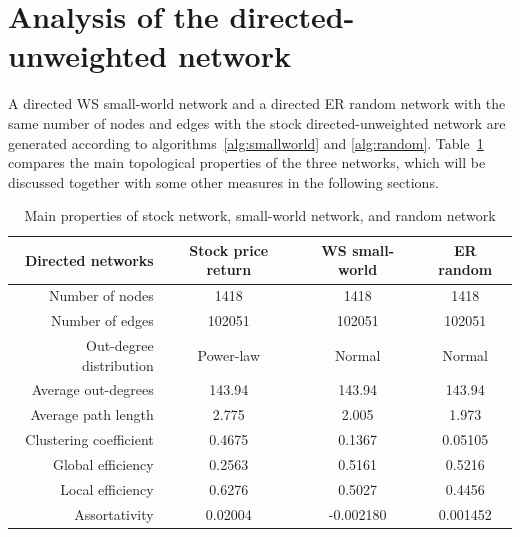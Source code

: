 \section{Analysis of the directed-unweighted network}
A directed WS small-world network and a directed ER random network with the same number of nodes and edges with the stock directed-unweighted network are generated according to algorithms~\ref{alg:smallworld} and \ref{alg:random}. Table~\ref{tab:three} compares the main topological properties of the three networks, which will be discussed together with some other measures in the following sections.

\begin{table}
	\begin{center}
		\begin{tabular}{r|c|c|c}\hline\hline
			\textbf{Directed networks}&\textbf{Stock price return}&\textbf{WS small-world}&\textbf{ER random}\\\hline
			Number of nodes&1418&1418&1418\\
			Number of edges&102051&102051&102051\\
			Out-degree distribution&Power-law&Normal&Normal\\
			Average out-degrees&143.94&143.94&143.94\\
			Average path length&2.775&2.005&1.973\\
			Clustering coefficient&0.4675&0.1367&0.05105\\
			Global efficiency&0.2563&0.5161&0.5216\\
			Local efficiency&0.6276&0.5027&0.4456\\
			Assortativity&0.02004&-0.002180&0.001452\\
			\hline\hline
		\end{tabular}
	\end{center}
	\caption{Main properties of stock network, small-world network, and random network}\label{tab:three}
\end{table}

